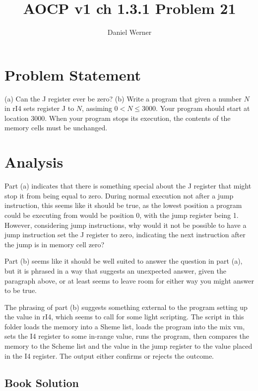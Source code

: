 \documentclass{article}
\title{AOCP v1 ch 1.3.1 Problem 21}
\author{Daniel Werner}
\begin{document}
\maketitle

\section*{
    Problem Statement
}

(a) Can the J register ever be zero? (b) Write a program that given
a number $N$ in rI4 sets register J to $N$, assiming
$0 < N \le 3000$.  Your program should start at location 3000.
When your program stops its execution, the contents of the memory
cells must be unchanged.

\section*{
    Analysis
}

Part (a) indicates that there is something special about the J register
that might stop it from being equal to zero.  During normal execution not
after a jump instruction, this seems like it should be true, as the
lowest position a program could be executing from would be position 0,
with the jump register being 1.  However, considering jump instructions,
why would it not be possible to have a jump instruction set the J register
to zero, indicating the next instruction after the jump is in memory cell
zero?

\par

Part (b) seems like it should be well suited to answer the question in part
(a), but it is phrased in a way that suggests an unexpected answer, given the
paragraph above, or at least seems to leave room for either way you might
answer to be true.

\par

The phrasing of part (b) suggests something external to the program setting
up the value in rI4, which seems to call for some light scripting. The script
in this folder loads the memory into a Sheme list, loads the program into the
mix vm, sets the I4 register to some in-range value, runs the program, then
compares the memory to the Scheme list and the value in the jump register to
the value placed in the I4 register.  The output either confirms or rejects
the outcome.

\subsection* {
  Book Solution
}
\end{document}
